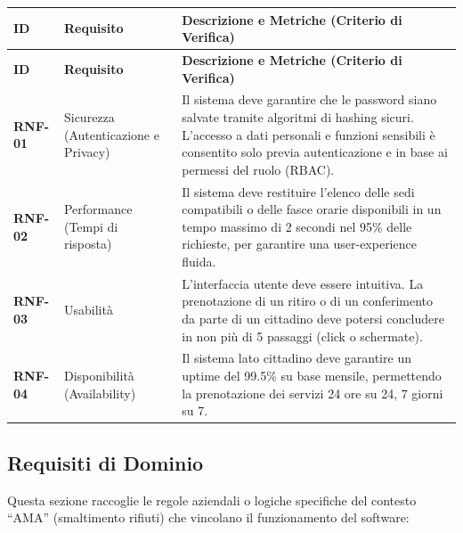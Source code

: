 \begin{center}
\renewcommand{\arraystretch}{1.3}
\begin{longtable}{|p{1.8cm}|p{3.8cm}|p{9.6cm}|}
\hline
\rowcolor{tableheader} \textbf{ID} & \textbf{Requisito} & \textbf{Descrizione e Metriche (Criterio di Verifica)} \\ \hline
\endfirsthead

\hline
\rowcolor{tableheader} \textbf{ID} & \textbf{Requisito} & \textbf{Descrizione e Metriche (Criterio di Verifica)} \\ \hline
\endhead

\textbf{RNF-01} & Sicurezza (Autenticazione e Privacy) & Il sistema deve garantire che le password siano salvate tramite algoritmi di hashing sicuri. L'accesso a dati personali e funzioni sensibili è consentito solo previa autenticazione e in base ai permessi del ruolo (RBAC). \\ \hline

\textbf{RNF-02} & Performance (Tempi di risposta) & Il sistema deve restituire l'elenco delle sedi compatibili o delle fasce orarie disponibili in un tempo massimo di 2 secondi nel 95\% delle richieste, per garantire una user-experience fluida. \\ \hline

\textbf{RNF-03} & Usabilità & L'interfaccia utente deve essere intuitiva. La prenotazione di un ritiro o di un conferimento da parte di un cittadino deve potersi concludere in non più di 5 passaggi (click o schermate). \\ \hline

\textbf{RNF-04} & Disponibilità (Availability) & Il sistema lato cittadino deve garantire un uptime del 99.5\% su base mensile, permettendo la prenotazione dei servizi 24 ore su 24, 7 giorni su 7. \\ \hline
\end{longtable}
\end{center}

\subsection{Requisiti di Dominio}
Questa sezione raccoglie le regole aziendali o logiche specifiche del contesto ``AMA'' (smaltimento rifiuti) che vincolano il funzionamento del software:

